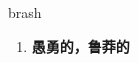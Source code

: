 
\begin{frame}
{\huge brash}
\begin{center}
\begin{enumerate}\Large
  \item \textbf{愚勇的，鲁莽的}
\end{enumerate}
\end{center}
\end{frame}

